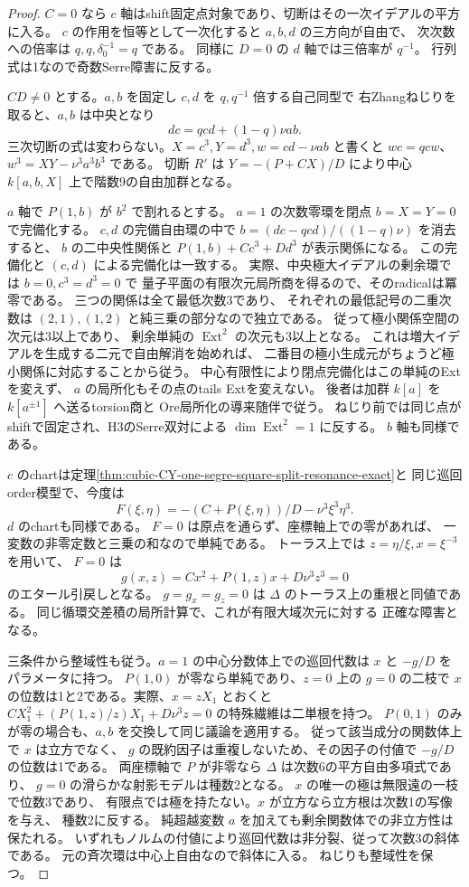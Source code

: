 \begin{proof}
$C=0$ なら $c$ 軸はshift固定点対象であり、切断はその一次イデアルの平方に入る。
$c$ の作用を恒等として一次化すると $a,b,d$ の三方向が自由で、
次次数への倍率は $q,q,\delta_0^{-1}=q$ である。
同様に $D=0$ の $d$ 軸では三倍率が $q^{-1}$。
行列式は1なので奇数Serre障害に反する。

$CD\ne0$ とする。$a,b$ を固定し $c,d$ を $q,q^{-1}$ 倍する自己同型で
右Zhangねじりを取ると、$a,b$ は中央となり
\[
 dc=qcd+(1-q)\nu ab .
\]
三次切断の式は変わらない。$X=c^3,Y=d^3,w=cd-\nu ab$ と書くと
$wc=qcw$、$w^3=XY-\nu^3 a^3b^3$ である。
切断 $R'$ は $Y=-(P+CX)/D$ により中心 $k[a,b,X]$ 上で階数9の自由加群となる。

$a$ 軸で $P(1,b)$ が $b^2$ で割れるとする。
$a=1$ の次数零環を閉点 $b=X=Y=0$ で完備化する。
$c,d$ の完備自由環の中で
$b=(dc-qcd)/((1-q)\nu)$ を消去すると、
$b$ の二中央性関係と $P(1,b)+C c^3+D d^3$ が表示関係になる。
この完備化と $(c,d)$ による完備化は一致する。
実際、中央極大イデアルの剰余環では $b=0,c^3=d^3=0$ で
量子平面の有限次元局所商を得るので、そのradicalは冪零である。
三つの関係は全て最低次数3であり、
それぞれの最低記号の二重次数は $(2,1),(1,2)$ と純三乗の部分なので独立である。
従って極小関係空間の次元は3以上であり、
剰余単純の $\operatorname{Ext}^2$ の次元も3以上となる。
これは増大イデアルを生成する二元で自由解消を始めれば、
二番目の極小生成元がちょうど極小関係に対応することから従う。
中心有限性により閉点完備化はこの単純のExtを変えず、
$a$ の局所化もその点のtails Extを変えない。
後者は加群 $k[a]$ を $k[a^{\pm1}]$ へ送るtorsion商と
Ore局所化の導来随伴で従う。
ねじり前では同じ点がshiftで固定され、H3のSerre双対による
$\dim \operatorname{Ext}^2=1$ に反する。
$b$ 軸も同様である。

$c$ のchartは定理\ref{thm:cubic-CY-one-segre-square-split-resonance-exact}と
同じ巡回order模型で、今度は
\[
 F(\xi,\eta)=-(C+P(\xi,\eta))/D-\nu^3\xi^3\eta^3 .
\]
$d$ のchartも同様である。
$F=0$ は原点を通らず、座標軸上での零があれば、
一変数の非零定数と三乗の和なので単純である。
トーラス上では $z=\eta/\xi,x=\xi^{-3}$ を用いて、
$F=0$ は
\[
 g(x,z)=C x^2+P(1,z)x+D\nu^3 z^3=0
\]
のエタール引戻しとなる。
$g=g_x=g_z=0$ は $\Delta$ のトーラス上の重根と同値である。
同じ循環交差積の局所計算で、これが有限大域次元に対する
正確な障害となる。

三条件から整域性も従う。$a=1$ の中心分数体上での巡回代数は
$x$ と $-g/D$ をパラメータに持つ。
$P(1,0)$ が零なら単純であり、$z=0$ 上の $g=0$ の二枝で
$x$ の位数は1と2である。実際、$x=zX_1$ とおくと
$CX_1^2+(P(1,z)/z)X_1+D\nu^3 z=0$ の特殊繊維は二単根を持つ。
$P(0,1)$ のみが零の場合も、$a,b$ を交換して同じ議論を適用する。
従って該当成分の関数体上で $x$ は立方でなく、
$g$ の既約因子は重複しないため、その因子の付値で $-g/D$ の位数は1である。
両座標軸で $P$ が非零なら $\Delta$ は次数6の平方自由多項式であり、
$g=0$ の滑らかな射影モデルは種数2となる。
$x$ の唯一の極は無限遠の一枝で位数3であり、
有限点では極を持たない。$x$ が立方なら立方根は次数1の写像を与え、
種数2に反する。
純超越変数 $a$ を加えても剰余関数体での非立方性は保たれる。
いずれもノルムの付値により巡回代数は非分裂、従って次数3の斜体である。
元の斉次環は中心上自由なので斜体に入る。
ねじりも整域性を保つ。


\end{proof}
